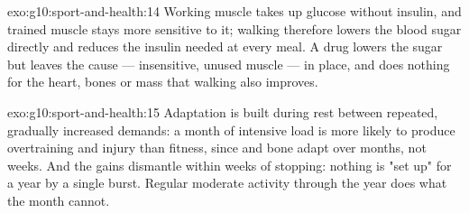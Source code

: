 \begin{solution}{exo:g10:sport-and-health:14}
Working muscle takes up glucose without insulin, and trained muscle
stays more sensitive to it; walking therefore lowers the blood sugar
directly and reduces the insulin needed at every meal. A drug lowers
the sugar but leaves the cause --- insensitive, unused muscle --- in
place, and does nothing for the heart, bones or mass that walking
also improves.
\end{solution}

\begin{solution}{exo:g10:sport-and-health:15}
Adaptation is built during rest between repeated, gradually increased
demands: a month of intensive load is more likely to produce
overtraining and injury than fitness, since  and bone adapt over
months, not weeks. And the gains dismantle within weeks of stopping:
nothing is "set up" for a year by a single burst. Regular moderate
activity through the year does what the month cannot.
\end{solution}

